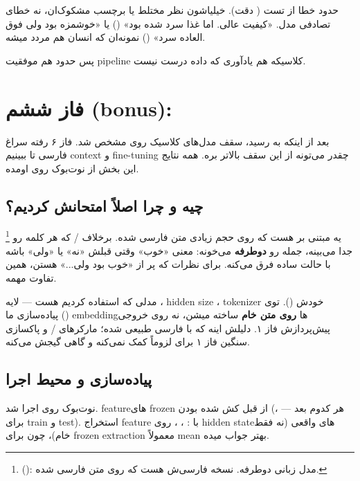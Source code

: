 \documentclass[a4paper,11pt]{article}
\begin{document}
حدود  خطا از  تست ( دقت). خیلیاشون نظر مختلط یا برچسب مشکوک‌ان، نه خطای تصادفی مدل. «کیفیت عالی. اما غذا سرد شده بود» () یا «خوشمزه بود ولی فوق العاده سرد» () نمونه‌ان که انسان هم مردد میشه.

پس  حدود  هم موفقیت pipeline کلاسیکه هم یادآوری که داده  درست  نیست.


\section{فاز ششم (bonus): }

بعد از اینکه  به  رسید، سقف مدل‌های کلاسیک روی  مشخص شد. فاز ۶ رفته سراغ  فارسی تا ببینیم context و fine-tuning چقدر می‌تونه از این سقف بالاتر بره. همه نتایج این بخش از نوت‌بوک  روی  اومده.

\subsection{ چیه و چرا اصلاً امتحانش کردیم؟}

\footnote{ (): مدل زبانی  دوطرفه.  نسخه فارسی‌ش هست که روی متن فارسی  شده.} یه  مبتنی بر  هست که روی حجم زیادی متن فارسی  شده. برخلاف / که هر کلمه رو جدا می‌بینه،  جمله رو \textbf{دوطرفه} می‌خونه: معنی «خوب» وقتی قبلش «نه» یا «ولی» باشه با حالت ساده فرق می‌کنه. برای نظرات  که پر از «خوب بود ولی...» هستن، همین تفاوت مهمه.

مدلی که استفاده کردیم  هست —  لایه ، hidden size ، tokenizer خودش (). توی پیاده‌سازی ما () embeddingها \textbf{روی متن خام}  ساخته میشن، نه روی خروجی پیش‌پردازش فاز ۱. دلیلش اینه که  با فارسی طبیعی  شده؛ مارکرهای / و پاکسازی سنگین فاز ۱ برای  لزوماً کمک نمی‌کنه و گاهی گیجش می‌کنه.

\subsection{پیاده‌سازی و محیط اجرا}
نوت‌بوک روی  اجرا شد. featureهای frozen از قبل کش شده بودن (،  — هر کدوم  بعد برای  train و  test). استخراج feature با : ، ،  روی hidden stateهای واقعی (نه فقط \lr{[CLS]} خام)، چون برای frozen extraction معمولاً mean بهتر جواب میده.
\end{document}
